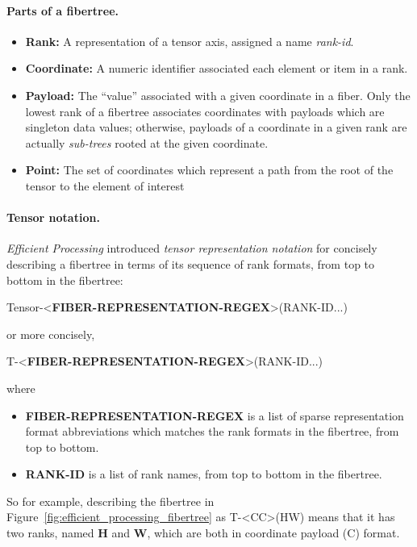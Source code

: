 \paragraph{Parts of a fibertree.}

\begin{itemize}
    \item \textbf{Rank:} A representation of a tensor axis, assigned a name \textit{rank-id}.
    \item \textbf{Coordinate:} A numeric identifier associated each element or item in a rank.
    \item \textbf{Payload:} The ``value'' associated with a given coordinate in a fiber. Only the lowest rank of a fibertree associates coordinates with payloads which are singleton data values; otherwise, payloads of a coordinate in a given rank are actually \textit{sub-trees} rooted at the given coordinate.
    \item \textbf{Point:} The set of coordinates which represent a path from the root of the tensor to the element of interest
\end{itemize}

\paragraph{Tensor notation.} \textit{Efficient Processing} introduced \textit{tensor representation notation}\cite{szebook} for concisely describing a fibertree in terms of its sequence of rank formats, from top to bottom in the fibertree:

Tensor-<\textbf{FIBER-REPRESENTATION-REGEX}>(RANK-ID...)

or more concisely,

T-<\textbf{FIBER-REPRESENTATION-REGEX}>(RANK-ID...)

where

\begin{itemize}
    \item \textbf{FIBER-REPRESENTATION-REGEX} is a list of sparse representation format abbreviations which matches the rank formats in the fibertree, from top to bottom.
    \item \textbf{RANK-ID} is a list of rank names, from top to bottom in the fibertree.
\end{itemize}

So for example, describing the fibertree in Figure~\ref{fig:efficient_processing_fibertree} as T-<CC>(HW) means that it has two ranks, named \textbf{H} and \textbf{W}, which are both in coordinate payload (C) format.


